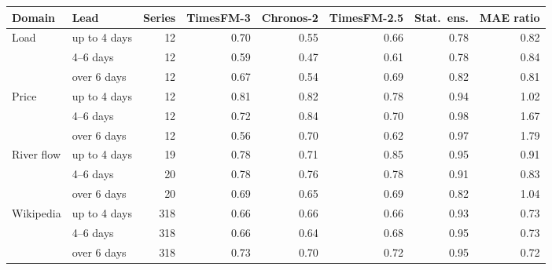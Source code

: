 \begin{tabular}{llrrrrrr}
\toprule
Domain & Lead & Series & TimesFM-3 & Chronos-2 & TimesFM-2.5 & Stat.\ ens. & MAE ratio \\
\midrule
Load & up to 4 days & 12 & 0.70 & 0.55 & 0.66 & 0.78 & 0.82 \\
 & 4--6 days & 12 & 0.59 & 0.47 & 0.61 & 0.78 & 0.84 \\
 & over 6 days & 12 & 0.67 & 0.54 & 0.69 & 0.82 & 0.81 \\
Price & up to 4 days & 12 & 0.81 & 0.82 & 0.78 & 0.94 & 1.02 \\
 & 4--6 days & 12 & 0.72 & 0.84 & 0.70 & 0.98 & 1.67 \\
 & over 6 days & 12 & 0.56 & 0.70 & 0.62 & 0.97 & 1.79 \\
River flow & up to 4 days & 19 & 0.78 & 0.71 & 0.85 & 0.95 & 0.91 \\
 & 4--6 days & 20 & 0.78 & 0.76 & 0.78 & 0.91 & 0.83 \\
 & over 6 days & 20 & 0.69 & 0.65 & 0.69 & 0.82 & 1.04 \\
Wikipedia & up to 4 days & 318 & 0.66 & 0.66 & 0.66 & 0.93 & 0.73 \\
 & 4--6 days & 318 & 0.66 & 0.64 & 0.68 & 0.95 & 0.73 \\
 & over 6 days & 318 & 0.73 & 0.70 & 0.72 & 0.95 & 0.72 \\
\bottomrule
\end{tabular}
